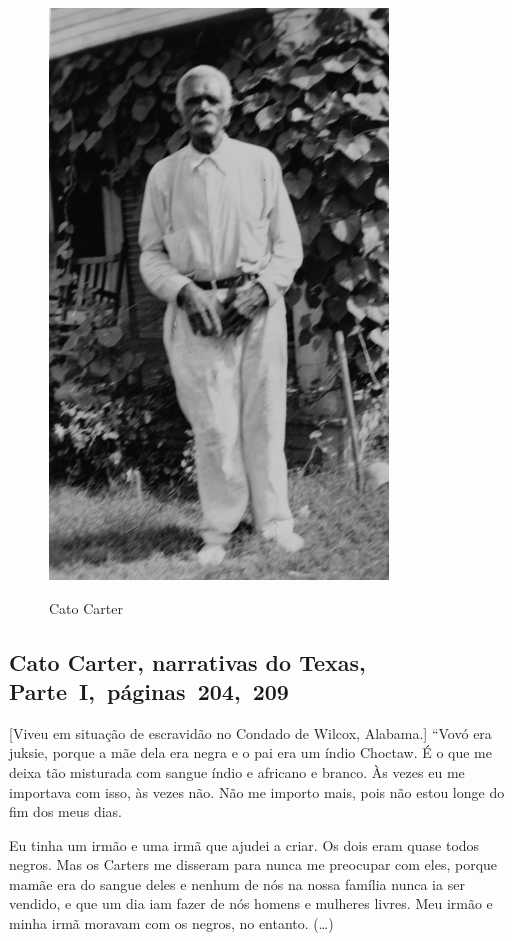 \begin{figure}[]
\centering
 \includegraphics[width=90mm]{./imgs/catocarter_recorte.jpg} \label{img10}
\caption{Cato Carter}
\end{figure}

\subsection{Cato Carter, narrativas do Texas, Parte~I,~páginas~204,~209} \label{ref52}

{[}Viveu em situação de escravidão no Condado de Wilcox, Alabama.{]} ``Vovó era juksie, porque a mãe dela era negra e o pai era um índio
Choctaw. É o que me deixa tão misturada com sangue índio e africano e
branco. Às vezes eu me importava com isso, às vezes não. Não me importo
mais, pois não estou longe do fim dos meus dias.

Eu tinha um irmão e uma irmã que ajudei a criar. Os dois eram quase
todos negros. Mas os Carters me disseram para nunca me preocupar com
eles, porque mamãe era do sangue deles e nenhum de nós na nossa família
nunca ia ser vendido, e que um dia iam fazer de nós homens e mulheres
livres. Meu irmão e minha irmã moravam com os negros, no entanto.
(\ldots{})

